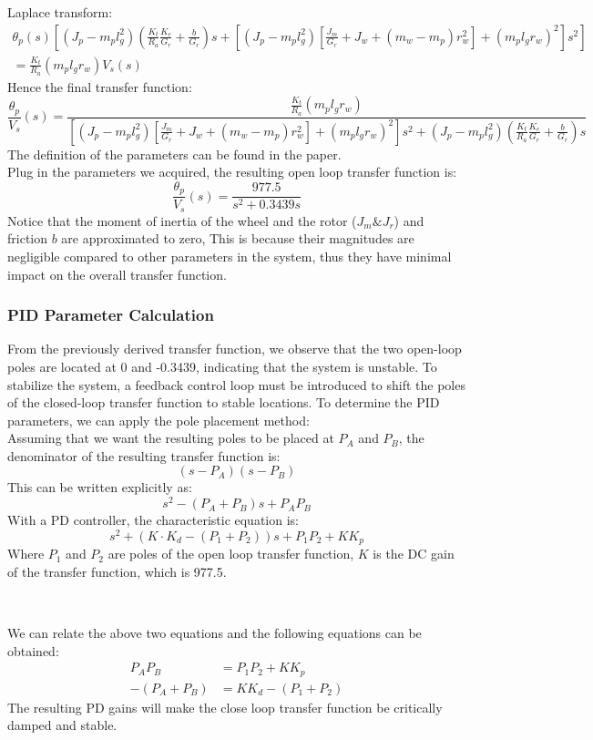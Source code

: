 \documentclass{article}
\begin{document}
Laplace transform:
\begin{multline*}
\theta_p(s) \left[ (J_p - m_p l_g^2) \left( \frac{K_t}{R_a} \frac{K_e}{G_r} + \frac{b}{G_r} \right) s + \left[ (J_p - m_p l_g^2) \left[ \frac{J_m}{G_r} + J_w + (m_w - m_p) r_w^2 \right] + (m_p l_g r_w)^2 \right] s^2 \right]
\\= \frac{K_t}{R_a} (m_p l_g r_w) V_s(s)
\end{multline*}
Hence the final transfer function:
\[
\frac{\theta_p}{V_s}(s) = \frac{\frac{K_t}{R_a} (m_p l_g r_w)}{\left[ (J_p - m_p l_g^2) \left[ \frac{J_m}{G_r} + J_w + (m_w - m_p) r_w^2 \right] + (m_p l_g r_w)^2 \right] s^2 + (J_p - m_p l_g^2) \left( \frac{K_t}{R_a} \frac{K_e}{G_r} + \frac{b}{G_r} \right) s}
\]
The definition of the parameters can be found in the paper. \\

Plug in the parameters we acquired, the resulting open loop transfer function is:
\[
\frac{\theta_p}{V_s}(s) = \frac{977.5}{s^2+0.3439s}
\]
Notice that the moment of inertia of the wheel and the rotor ($J_m \& J_r$) and
friction $b$ are approximated to zero, This is because their magnitudes are
negligible compared to other parameters in the system, thus they have
minimal impact on the overall transfer function.

\subsubsection{PID Parameter Calculation}

From the previously derived transfer function, we observe that the two open-loop
poles are located at 0 and -0.3439, indicating that the system is unstable. To
stabilize the system, a feedback control loop must be introduced to shift the
poles of the closed-loop transfer function to stable locations. To determine the
PID parameters, we can apply the pole placement method: \\

Assuming that we want the resulting poles to be placed at $P_A$ and $P_B$, the
denominator of the resulting transfer function is:
\[
(s-P_A)(s-P_B)
\]
This can be written explicitly as:
\[
s^2 - (P_A + P_B)s + P_AP_B
\]
With a PD controller, the characteristic equation is:
\[
s^2 + (K \cdot K_d - (P_1 + P_2))s + P_1P_2 + KK_p
\]
Where $P_1$ and $P_2$ are poles of the open loop transfer function, $K$ is the
DC gain of the transfer function, which is 977.5.

\

We can relate the above two equations and the following equations can be obtained:
\begin{align*}
    P_AP_B &=  P_1P_2 + KK_p\\
    -(P_A + P_B) &= KK_d - (P_1 + P_2)
\end{align*}
The resulting PD gains will make the close loop transfer function be critically
damped and stable.
\end{document}
